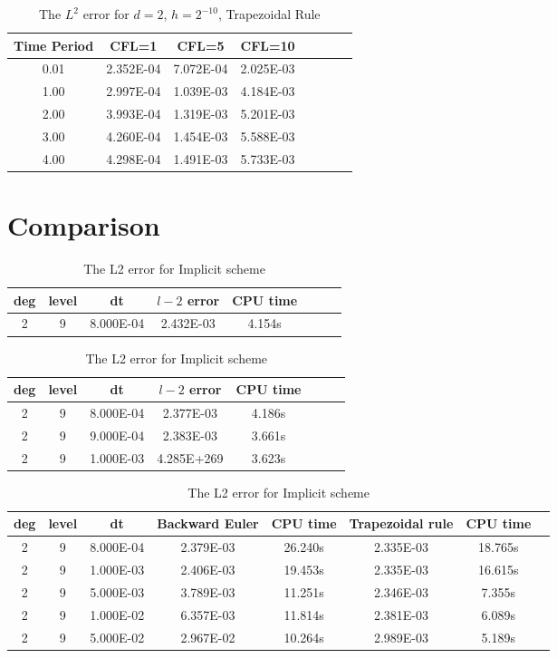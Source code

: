 \documentclass[a4paper]{article}
\begin{document}
\begin{table}
\caption{\label{tab:test}The $L^2$ error for $d=2$, $h=2^{-10}$, Trapezoidal Rule}
\centering
\begin{tabular}{cccccccc}
\toprule
Time Period&CFL=1&CFL=5&CFL=10\\
\midrule
0.01&2.352E-04&7.072E-04&2.025E-03\\
1.00&2.997E-04&1.039E-03&4.184E-03\\
2.00&3.993E-04&1.319E-03&5.201E-03\\
3.00&4.260E-04&1.454E-03&5.588E-03\\
4.00&4.298E-04&1.491E-03&5.733E-03\\
\bottomrule
\end{tabular}
\end{table}



\section{Comparison}

\begin{table}[htbp]
\caption{\label{tab:test}1D: The L2 error for Explicit 3rd Runge Kutta with time period=1.5}
\centering
\vspace{5pt}
\begin{tabular}{cccccccc}
\toprule
deg & level&dt&$l-2$ error &CPU time \\
\midrule
2&9&8.000E-04&2.432E-03&4.154s\\
\bottomrule
\end{tabular}
\caption{\label{tab:test}The L2 error for Semi-Implicit Backward Euler}
\centering
\vspace{5pt}

\begin{tabular}{cccccccc}
\toprule
deg & level&dt&$l-2$ error &CPU time \\
\midrule
2&9&8.000E-04&2.377E-03&4.186s\\
2&9&9.000E-04&2.383E-03&3.661s\\
2&9&1.000E-03&4.285E+269&3.623s\\
\bottomrule
\end{tabular}


\caption{\label{tab:test}The L2 error for Implicit scheme}
\centering
\vspace{5pt}

\begin{tabular}{cccccccc}
\toprule
deg & level&dt&Backward Euler &CPU time &Trapezoidal rule&CPU time\\
\midrule
2&9&8.000E-04&2.379E-03&26.240s&2.335E-03&18.765s\\
2&9&1.000E-03&2.406E-03&19.453s&2.335E-03&16.615s\\
2&9&5.000E-03&3.789E-03&11.251s&2.346E-03&7.355s\\
2&9&1.000E-02&6.357E-03&11.814s&2.381E-03&6.089s\\
2&9&5.000E-02&2.967E-02&10.264s&2.989E-03&5.189s\\
\bottomrule
\end{tabular}


\end{table}
\end{document}
